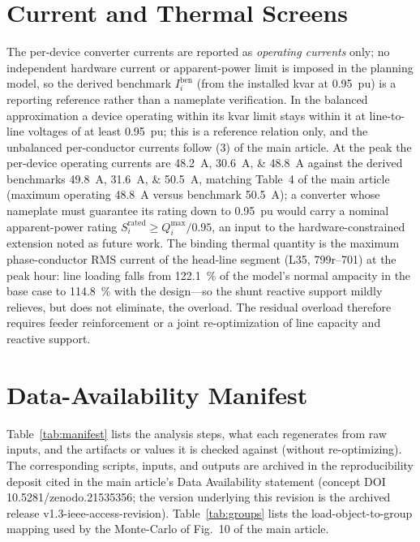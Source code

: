 \documentclass[journal]{IEEEtran}
\begin{document}
\section{Current and Thermal Screens}
\label{ssec:screen}
The per-device converter currents are reported as \emph{operating currents} only; no
independent hardware current or apparent-power limit is imposed in the planning model,
so the derived benchmark $I^{\mathrm{ben}}_i$ (from the installed kvar at
\SI{0.95}{pu}) is a reporting reference rather than a nameplate verification. In the balanced
approximation a device operating within its kvar limit stays within it at line-to-line
voltages of at least \SI{0.95}{pu}; this is a reference relation only, and the unbalanced
per-conductor currents follow (3) of the main article. At the peak the
per-device operating currents are \SIlist{48.2;30.6;48.8}{A} against the derived
benchmarks \SIlist{49.8;31.6;50.5}{A}, matching Table~4 of the main article
(maximum operating \SI{48.8}{A} versus benchmark \SI{50.5}{A}); a
converter whose nameplate must guarantee its rating down to \SI{0.95}{pu} would carry
a nominal apparent-power rating $S^{\mathrm{rated}}_i\ge Q^{\max}_i/0.95$, an input to
the hardware-constrained extension noted as future work. The binding thermal quantity is the
maximum phase-conductor RMS current of the head-line segment (L35, 799r--701) at the
peak hour: line loading falls from \SI{122.1}{\percent} of the model's normal
ampacity in the base case to \SI{114.8}{\percent} with the design---so the shunt
reactive support mildly relieves, but does not eliminate, the overload. The residual
overload therefore requires feeder reinforcement or a joint re-optimization of line
capacity and reactive support.

\section{Data-Availability Manifest}
\label{ssec:manifest}
Table~\ref{tab:manifest} lists the analysis steps, what each regenerates from raw
inputs, and the artifacts or values it is checked against (without re-optimizing). The
corresponding scripts, inputs, and outputs are archived in the reproducibility deposit
cited in the main article's Data Availability statement (concept DOI
10.5281/zenodo.21535356; the version underlying this revision is the archived release v1.3-ieee-access-revision).
Table~\ref{tab:groups} lists the load-object-to-group mapping used by the Monte-Carlo of
Fig.~10 of the main article.
\end{document}
